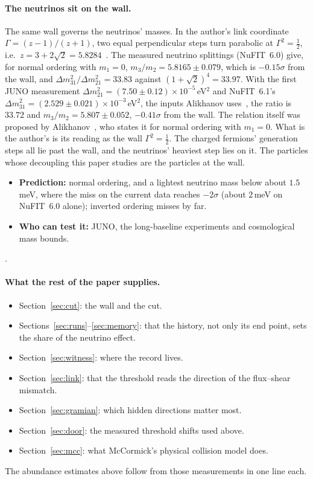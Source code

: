\paragraph{The neutrinos sit on the wall.} The same wall governs the neutrinos' masses. In the author's link coordinate $\Gamma=(z-1)/(z+1)$, two equal perpendicular steps turn parabolic at $\Gamma^2=\tfrac12$, i.e.\ $z=3+2\sqrt2=5.8284$~\cite{SMball}. The measured neutrino splittings (NuFIT~6.0) give, for normal ordering with $m_1=0$, $m_3/m_2=5.8165\pm0.079$, which is $-0.15\sigma$ from the wall, and $\Delta m^2_{31}/\Delta m^2_{21}=33.83$ against $(1+\sqrt2)^4=33.97$. With the first JUNO measurement $\Delta m^2_{21}=(7.50\pm0.12)\times10^{-5}\,$eV$^2$ and NuFIT~6.1's $\Delta m^2_{31}=(2.529\pm0.021)\times10^{-3}\,$eV$^2$, the inputs Alikhanov uses~\cite{Alik}, the ratio is $33.72$ and $m_3/m_2=5.807\pm0.052$, $-0.41\sigma$ from the wall. The relation itself was proposed by Alikhanov~\cite{Alik}, who states it for normal ordering with $m_1=0$. What is the author's is its reading as the wall $\Gamma^2=\tfrac12$. The charged fermions' generation steps all lie past the wall, and the neutrinos' heaviest step lies on it. The particles whose decoupling this paper studies are the particles at the wall.
\begin{itemize}
\item \textbf{Prediction:} normal ordering, and a lightest neutrino mass below about $1.5$\,meV, where the miss on the current data reaches $-2\sigma$ (about $2$\,meV on NuFIT~6.0 alone); inverted ordering misses by far.
\item \textbf{Who can test it:} JUNO, the long-baseline experiments and cosmological mass bounds.
\end{itemize}
.

\paragraph{What the rest of the paper supplies.}
\begin{itemize}
\item Section~\ref{sec:cut}: the wall and the cut.
\item Sections~\ref{sec:runs}--\ref{sec:memory}: that the history, not only its end point, sets the share of the neutrino effect.
\item Section~\ref{sec:witness}: where the record lives.
\item Section~\ref{sec:link}: that the threshold reads the direction of the flux--shear mismatch.
\item Section~\ref{sec:gramian}: which hidden directions matter most.
\item Section~\ref{sec:door}: the measured threshold shifts used above.
\item Section~\ref{sec:mcc}: what McCormick's physical collision model does.
\end{itemize}
The abundance estimates above follow from those measurements in one line each.
